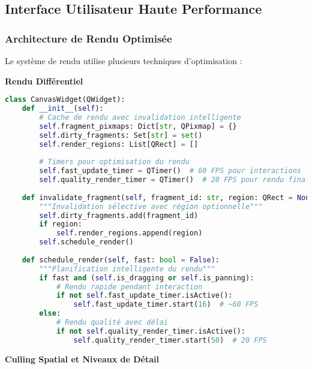 \documentclass[12pt,a4paper]{report}
\begin{document}
\subsection{Interface Utilisateur Haute Performance}

\subsubsection{Architecture de Rendu Optimisée}

Le système de rendu utilise plusieurs techniques d'optimisation :

\textbf{Rendu Différentiel}

\begin{lstlisting}[language=Python]
class CanvasWidget(QWidget):
    def __init__(self):
        # Cache de rendu avec invalidation intelligente
        self.fragment_pixmaps: Dict[str, QPixmap] = {}
        self.dirty_fragments: Set[str] = set()
        self.render_regions: List[QRect] = []
        
        # Timers pour optimisation du rendu
        self.fast_update_timer = QTimer()  # 60 FPS pour interactions
        self.quality_render_timer = QTimer()  # 20 FPS pour rendu final
        
    def invalidate_fragment(self, fragment_id: str, region: QRect = None):
        """Invalidation sélective avec région optionnelle"""
        self.dirty_fragments.add(fragment_id)
        if region:
            self.render_regions.append(region)
        self.schedule_render()
    
    def schedule_render(self, fast: bool = False):
        """Planification intelligente du rendu"""
        if fast and (self.is_dragging or self.is_panning):
            # Rendu rapide pendant interaction
            if not self.fast_update_timer.isActive():
                self.fast_update_timer.start(16)  # ~60 FPS
        else:
            # Rendu qualité avec délai
            if not self.quality_render_timer.isActive():
                self.quality_render_timer.start(50)  # 20 FPS
\end{lstlisting}

\textbf{Culling Spatial et Niveaux de Détail}
\end{document}

